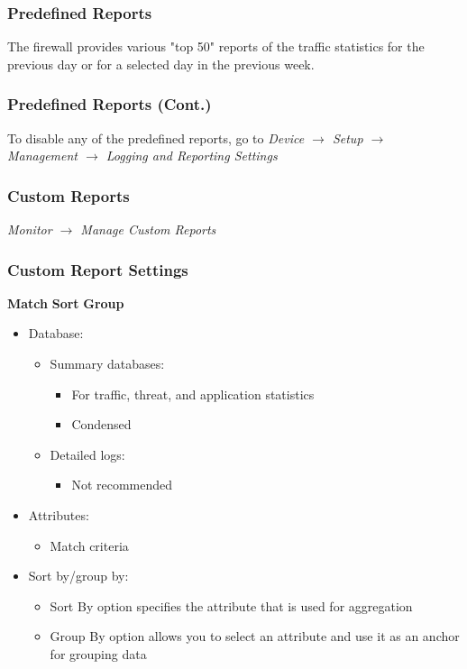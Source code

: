 \subsubsection{Predefined Reports}
The firewall provides various "top 50" reports of the traffic statistics for the previous day or for a selected day in the previous week.

\subsubsection{Predefined Reports (Cont.)}
To disable any of the predefined reports, go to \textit{Device $\rightarrow$ Setup $\rightarrow$ Management $\rightarrow$ Logging and Reporting Settings}

\subsubsection{Custom Reports}
\textit{Monitor $\rightarrow$ Manage Custom Reports}

\subsubsection{Custom Report Settings}
\textbf{Match} \textbf{Sort} \textbf{Group}
\begin{itemize}
    \item Database:
        \begin{itemize}
            \item Summary databases:
                \begin{itemize}
                    \item For traffic, threat, and application statistics
                    \item Condensed
                \end{itemize}
            \item Detailed logs:
                \begin{itemize}
                    \item Not recommended
                \end{itemize}
        \end{itemize}
    \item Attributes:
        \begin{itemize}
            \item Match criteria
        \end{itemize}
    \item Sort by/group by:
        \begin{itemize}
            \item Sort By option specifies the attribute that is used for aggregation
            \item Group By option allows you to select an attribute and use it as an anchor for grouping data
        \end{itemize}
\end{itemize}

